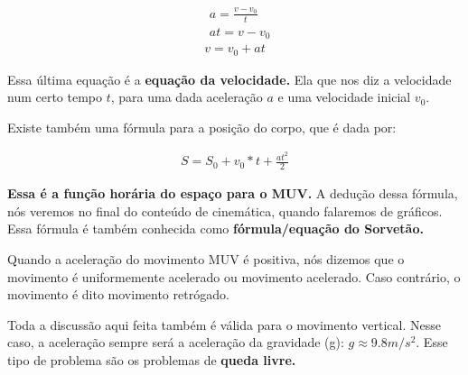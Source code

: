 \documentclass[12pt]{extarticle}
\newcommand{\<}{\langle}
\renewcommand{\>}{\rangle}
\theoremstyle{definition}
\begin{document}
    \begin{align*}
        &a = \frac{v - v_0}{t} \\
        & at = v - v_0
        \end{align*}
        \begin{align}\label{eq:velocidade}
        v = v_0 + at  
        \end{align}
        
        Essa última equação é a \textbf{equação da velocidade.} Ela que nos diz a velocidade num certo tempo $t$, para uma dada aceleração $a$ e uma velocidade inicial $v_0$.
        
        Existe também uma fórmula para a posição do corpo, que é dada por:
        
        \begin{align}\label{eq:sorvetao}
            S = S_0 + v_0*t + \frac{at^2}{2}
        \end{align}
        
        \textbf{Essa é a função horária do espaço para o MUV.} A dedução dessa fórmula, nós veremos no final do conteúdo de cinemática, quando falaremos de gráficos. Essa fórmula é também conhecida como \textbf{fórmula/equação do Sorvetão.}
        
        Quando a aceleração do movimento MUV é positiva, nós dizemos que o movimento é uniformemente acelerado ou movimento acelerado. Caso contrário, o movimento é dito movimento retrógado.
        
        Toda a discussão aqui feita também é válida para o movimento vertical. Nesse caso, a aceleração sempre será a aceleração da gravidade (g): $g\approx 9.8 m/s^2$. Esse tipo de problema são os problemas de \textbf{queda livre.}
        
\end{document}
